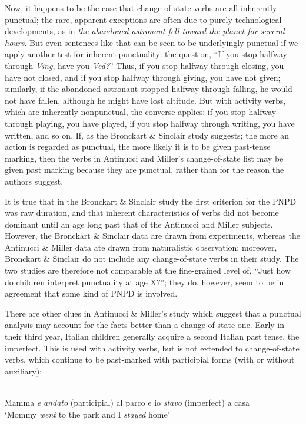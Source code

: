 Now, it happens to be the case that change-of-state verbs are all inherently punctual; the rare, apparent exceptions are often due to purely technological developments, as in \textit{the abandoned astronaut fell toward the planet for several hours}. But even sentences like that can be seen to be underlyingly punctual if we apply another test for inherent punctuality: the question, ``If you stop halfway through \textit{Ving}, have you \textit{Ved?}'' Thus, if you stop halfway through closing, you have not closed, and if you stop halfway through giving, you have not given; similarly, if the abandoned astronaut stopped halfway through falling, he would not have fallen, although he might have lost altitude. But with activity verbs, which are inherently nonpunctual, the converse applies: if you stop halfway through playing, you have played, if you stop halfway through writing, you have written, and so on. If, as the Bronckart \& Sinclair study suggests; the more an action is regarded as punctual, the more likely it is to be given past-tense marking, then the verbs in Antinucci and Miller's change-of-state list may be given past marking because they are punctual, rather than for the reason the authors suggest.

It is true that in the Bronckart \& Sinclair study the first criterion for the PNPD was raw duration, and that inherent characteristics of verbs did not become dominant until an age long past that of the Antinucci and Miller subjects. However, the Bronckart \& Sinclair data are drawn from experiments, whereas the Antinucci \& Miller data ate drawn from naturalistic observation; moreover, Bronckart \& Sinclair do not include any change-of-state verbs in their study. The two studies are therefore not comparable at the fine-grained level of, ``Just how do children interpret punctuality at age X?''; they do, however, seem to be in agreement that some kind of PNPD is involved.

There are other clues in Antinucci \& Miller's study which
suggest that a punctual analysis may account for the facts better than a change-of-state one. Early in their third year, Italian children generally acquire a second Italian past tense, the imperfect. This is used with activity verbs, but is not extended to change-of-state verbs, which continue to be past-marked with participial forms (with or without auxiliary):

\ea\label{ex:3:22}
\\
  Mamma \textit{e} \textit{andato} (participial) al parco e io \textit{stavo} (imperfect) a casa\\
\glt `Mommy \textit{went} to the park and I \textit{stayed} home'
\z

